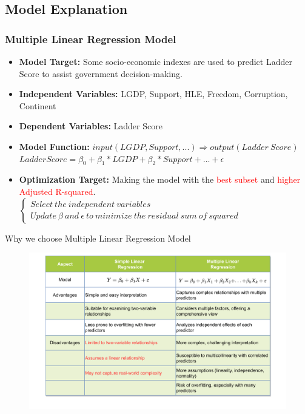 \documentclass{beamer}
\begin{document}
\subsection{Model Explanation}
% 
% 
% 
% 
\begin{frame}
  \frametitle{Multiple Linear Regression Model}
  \begin{itemize}
    \item \textbf{Model Target:} Some socio-economic indexes are used to predict Ladder Score to assist government decision-making.
    \item \textbf{Independent Variables:} LGDP, Support, HLE, Freedom, Corruption, Continent
    \item \textbf{Dependent Variables:} Ladder Score
    \item \textbf{Model Function:} $input(LGDP, Support,...) \Rightarrow output(Ladder\ Score)$
          $ Ladder Score = \beta_0 + \beta_1 * LGDP + \beta_2 * Support + ... + \epsilon $
    \item \textbf{Optimization Target:} Making the model with the \textcolor{red}{best subset} and \textcolor{red}{higher Adjusted R-squared}. $
            \left\{
            \begin{matrix}
              Select\ the\ independent\ variables \\
              Update\ \beta\ and\ \epsilon\ to\ minimize\ the\ residual\ sum\ of\ squared
            \end{matrix}
            \right.
          $
  \end{itemize}
\end{frame}
% 
% 
% 
% 
\begin{frame}{Why we choose Multiple Linear Regression Model}
  \begin{figure}
    \includegraphics[width=\textwidth]{img/Why choose this model.png}
  \end{figure}
\end{frame}
% 
% 
% 
% 
\end{document}
